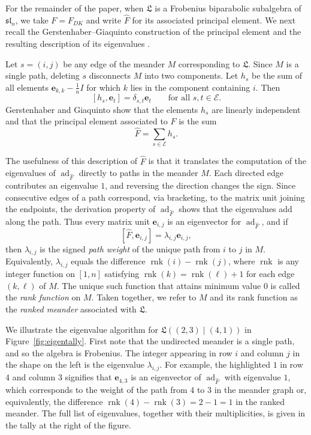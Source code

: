 \documentclass{amsart}
\def\be{\mathbf{e}}
\def\cE{\mathcal E} %
\def\sl{\mathfrak{sl}}
\def\L{\mathfrak L}
\def\hatF{\widehat{F}}
\def\sln{\sl_n}
\def\ad{\operatorname{ad}}
\def\rnk{\operatorname{rnk}}
\theoremstyle{definition}
\begin{document}
For the remainder of the paper, when $\L$ is a Frobenius biparabolic
subalgebra of $\sln$, we take $F=F_{DK}$ and write $\hatF$ for its associated
principal element.
We next recall the Gerstenhaber--Giaquinto construction of the principal
element and the resulting description of its eigenvalues
\cite{gerstenhaber2009principal}. 

Let $s=(i,j)$ be any edge of the meander $M$ corresponding to $\L$. Since $M$ is a single path, deleting $s$ disconnects $M$ into two components. Let $h_s$ be the sum of all elements
$\be_{k,k}-\frac{1}{n}I$ for which 
$k$ lies in the component containing $i$. Then
\[
[h_s,\be_t]=\delta_{s,t}\be_t
\qquad\text{for all }s,t\in\cE.
\]
Gerstenhaber and Giaquinto show that the elements $h_s$ are linearly
independent and that the principal element associated to $F$ is the sum
\[
\hatF=\sum_{s\in\cE}h_s.
\]

The usefulness of this description of $\hatF$ is that it translates the
computation of the eigenvalues of $\ad_{\hatF}$ directly to  paths in the meander $M$. Each directed edge contributes an eigenvalue $1$, and
reversing the direction changes the sign. Since consecutive edges of a
path correspond, via bracketing, to the matrix unit joining the
endpoints, the derivation property of $\ad_{\hatF}$ shows that the
eigenvalues add along the path. Thus every matrix unit $\be_{i,j}$ is an
eigenvector for $\ad_{\hatF}$, and if
\[
[\hatF,\be_{i,j}]=\lambda_{i,j}\be_{i,j},
\]
then $\lambda_{i,j}$ is the signed \emph{path weight} of the unique path from $i$ to
$j$ in $M$.  Equivalently, $\lambda_{i,j}$ equals the difference $\rnk(i)-\rnk(j)$, where $\rnk$ is any integer function on $[1,n]$  satisfying $\rnk(k)=\rnk(\ell)+1$ for each edge $(k,\ell)$ of $M$.  The unique such function that attains minimum value 0 is called the \emph{rank function} on $M$. Taken together, we refer to $M$ and its rank function as the \emph{ranked meander} associated with $\L$.

We illustrate the eigenvalue algorithm for $\L((2,3)\mid (4,1))$ in 
Figure~\ref{fig:eigentally}. First note that the undirected meander is a single path, and so the algebra is Frobenius. The integer appearing in row $i$ and column $j$ in the shape on the left is the eigenvalue $\lambda_{i,j}$. For example, the highlighted $1$ in row $4$ and column $3$ 
signifies that $\be_{4,3}$ is an eigenvector of $\ad_{\hatF}$ with 
eigenvalue $1$, which corresponds to the weight of the path from $4$ to $3$ in the meander graph or, equivalently, the  difference $\rnk(4)-\rnk(3)=2-1=1$ in the ranked meander. The full list of eigenvalues, together with their multiplicities, is given in the tally at the right of the figure. 
\end{document}
